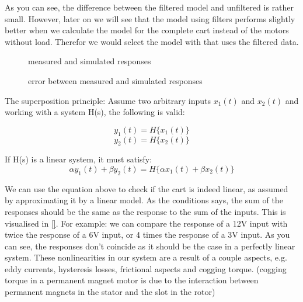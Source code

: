 \documentclass[a4paper]{article}
\newcommand{\newpar}{\vspace{.3cm}\noindent}
\begin{document}
\newpar
As you can see, the difference between the filtered model and unfiltered is rather small. However, later on we will see that the model using filters performs slightly better when we calculate the model for the complete cart instead of the motors without load. Therefor we would select the model with that uses the filtered data.

\begin{figure}[H]
    \caption{measured and simulated responses}
    \label{fig:StepResponse}
\end{figure}

\begin{figure}[H]
    \caption{error between measured and simulated responses}
    \label{fig:StepResponseError}
\end{figure}

\newpar
The superposition principle:
Assume two arbitrary inputs $x_1(t)$ and $x_2(t)$ and working with a system H(s), the following is valid:

\begin{equation}
    y_1(t) = H\{x_1(t)\}
\end{equation}
\begin{equation}
    y_2(t) = H\{x_2(t)\}
\end{equation}

\newpar
If H(s) is a linear system, it must satisfy:
\begin{equation}
    \alpha y_1(t) + \beta y_2(t) = H\{\alpha x_1(t)+\beta x_2(t)\}
\end{equation}

\newpar
We can use the equation above to check if the cart is indeed linear, as assumed by approximating it by a linear model. As the conditions says, the sum of the responses should be the same as the response to the sum of the inputs.  This is visualised in \autoref{}. For example: we can compare the response of a 12V input with twice the response of a 6V input, or 4 times the response of a 3V input. As you can see, the responses don't coincide as it should be the case in a perfectly linear system. These nonlinearities in our system are a result of a couple aspects, e.g. eddy currents, hysteresis losses, frictional aspects and cogging torque. (cogging torque in a permanent magnet motor is due to the interaction between permanent magnets in the stator and the slot in the rotor)
\end{document}
